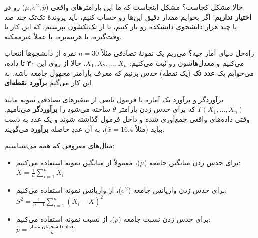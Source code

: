 \documentclass[12pt,a4paper,oneside]{report}
\begin{document}
حالا مشکل کجاست؟ مشکل اینجاست که ما این پارامترهای واقعی ($\mu, \sigma^2, p$) رو \textbf{در اختیار نداریم}! اگر بخوایم مقدار دقیق این‌ها رو حساب کنیم، باید پروندهٔ تک‌تک چند صد یا چند هزار دانشجوی دانشکده رو باز کنیم، یا از تک‌تکشون بپرسیم، که این کار یا وقت‌گیره، یا هزینه‌بره، یا عملاً غیرممکنه.

\begin{center}
\end{center}

راه‌حل دنیای آمار چیه؟ می‌ریم یک نمونهٔ تصادفی مثلاً $n=30$ نفره از دانشجوها انتخاب می‌کنیم و معدل‌هاشون رو ثبت می‌کنیم: $X_1, X_2, \dots, X_n$. حالا از روی این ۳۰ تا داده، می‌خوایم یک \textbf{عدد تک} (یک نقطه) حدس بزنیم که معرف پارامتر مجهول جامعه باشه. به این کار می‌گیم \textbf{برآورد نقطه‌ای }.

\begin{definition}{برآوردگر و برآورد}
یک آماره یا فرمول تابعی از متغیرهای تصادفی نمونه مانند $T(X_1, \dots, X_n)$ که برای حدس زدن پارامتر $\theta$ ساخته می‌شود را \textbf{برآوردگر } می‌نامیم. وقتی داده‌های واقعی جمع‌آوری شده و داخل فرمول گذاشته شوند و یک عدد به دست بیاید (مثلاً $\bar{x} = 16.4$)، به آن عددِ حاصله \textbf{برآورد } می‌گویند.
\end{definition}

مثال‌های معروفی که همه می‌شناسیم:
\begin{itemize}[itemsep=2pt]
\item برای حدس زدن میانگین جامعه ($\mu$)، معمولاً از میانگین نمونه استفاده می‌کنیم: $\bar{X} = \frac{1}{n}\sum_{i=1}^n X_i$
\item برای حدس زدن واریانس جامعه ($\sigma^2$)، از واریانس نمونه استفاده می‌کنیم: $S^2 = \frac{1}{n-1}\sum_{i=1}^n (X_i - \bar{X})^2$
\item برای حدس زدن نسبت جامعه ($p$)، از نسبت نمونه استفاده می‌کنیم: $\hat{p} = \frac{\text{تعداد دانشجویان ممتاز}}{n}$
\end{itemize}
\end{document}
